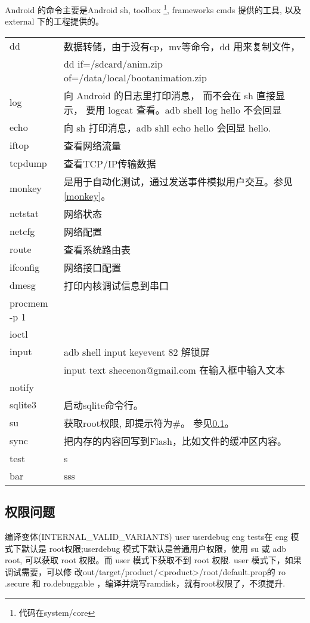 \documentclass[a4paper,titlepage]{article}
\makeatletter
\newcommand{\tabcaption}{\def\@captype{table}\caption}
\makeatother
\begin{document}
Android 的命令主要是Android sh, toolbox \footnote{代码在system/core},
frameworks cmds 提供的工具, 以及 external 下的工程提供的。
\tabcaption{Android 常用命令}
\begin{longtable}{|p{}|p{}|}\hline
dd & 数据转储，由于没有cp，mv等命令，dd 用来复制文件，\\
    & dd if=/sdcard/anim.zip of=/data/local/bootanimation.zip
    \\\hline
log & 向 Android 的日志里打印消息， 而不会在 sh 直接显示， 要用 logcat 查看。adb shell log hello 不会回显\\\hline
echo & 向 sh 打印消息，adb shll echo hello 会回显 hello.\\\hline
iftop & 查看网络流量 \\\hline
tcpdump & 查看TCP/IP传输数据 \\\hline
monkey & 是用于自动化测试，通过发送事件模拟用户交互。参见\ref{monkey}。\\\hline
netstat & 网络状态 \\\hline
netcfg &  网络配置     \\\hline
route & 查看系统路由表 \\\hline
ifconfig & 网络接口配置 \\\hline
dmesg & 打印内核调试信息到串口 \\\hline
procmem -p 1 &\\\hline
ioctl &\\\hline
input &adb shell input keyevent 82 解锁屏\\
& input text shecenon@gmail.com 在输入框中输入文本\\\hline
notify &\\\hline
sqlite3 & 启动sqlite命令行。\\\hline
su & 获取root权限, 即提示符为\#。 参见\ref{privilege}。\\\hline
sync & 把内存的内容回写到Flash，比如文件的缓冲区内容。\\\hline
test & s \footnotemark \\\hline
bar & sss \footnotemark \\\hline
\end{longtable}

\addtocounter{footnote}{-1} 

\subsection{权限问题}\label{privilege}
编译变体(INTERNAL_VALID_VARIANTS) user userdebug eng tests在 eng 模式下默认是
root权限;userdebug 模式下默认是普通用户权限，使用 su 或 adb root, 可以获取
root 权限。而 user 模式下获取不到 root 权限. user 模式下，如果调试需要，可以修
改out/target/product/<product>/root/default.prop的 ro .secure 和 ro.debuggable
，编译并烧写ramdisk，就有root权限了，不须提升.
\end{document}
